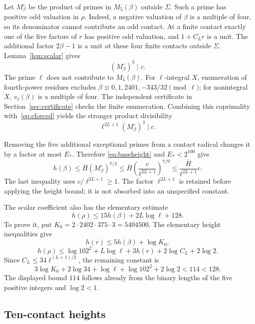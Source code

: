 \documentclass[11pt,a4paper]{article}
\begin{document}
Let $M_\beta^\circ$ be the product of primes in $M_5(\beta)$
outside $\Sigma$. Such a prime has positive odd valuation in $\rho$.
Indeed, a negative valuation of $\beta$ is a multiple of four,
so its denominator cannot contribute an odd contact. At a finite
contact exactly one of the five factors of $r$ has positive odd
valuation, and $1+C_Lr$ is a unit. The additional factor $2\beta-1$
is a unit at these four finite contacts outside $\Sigma$.
Lemma~\ref{lem:scalar} gives
\[
                         (M_\beta^\circ)^3\mid c.
\]
The prime $\ell$ does not contribute to $M_5(\beta)$. For
$\ell$-integral $X$, enumeration of fourth-power residues excludes
$\beta\equiv0,1,2401,-343/32\pmod\ell$; for nonintegral $X$,
$v_\ell(\beta)$ is a multiple of four. The independent certificate
in Section~\ref{sec:certificate} checks the finite enumeration.
Combining this coprimality with~\eqref{eq:cforced} yields the stronger
product divisibility
\begin{equation}\label{eq:coprime}
               \ell^{2L+1}(M_\beta^\circ)^3\mid c.
\end{equation}

Removing the five additional exceptional primes from a contact
radical changes it by a factor at most $E_*$. Therefore
\eqref{eq:baseheight} and $E_*<2^{100}$ give
\begin{equation}\label{eq:scalarheight}
 h(\beta)\le\overline H(M_\beta^\circ)^{7/3}
       \le\overline H\left(\frac{c}{\ell^{2L+1}}\right)^{7/9}
       \le\frac{\overline H}{\ell^{2L+1}}c.
\end{equation}
The last inequality uses $c/\ell^{2L+1}\ge1$. The factor
$\ell^{2L+1}$ is retained before applying the height bound; it is
not absorbed into an unspecified constant.

The scalar coefficient also has the elementary estimate
\begin{equation}\label{eq:rhoheight}
                    h(\rho)\le15h(\beta)+2L\log\ell+128.
\end{equation}
To prove it, put $K_0=2\cdot2402\cdot375\cdot3=5404500$.
The elementary height inequalities give
\[
 h(r)\le5h(\beta)+\log K_0,
\]
\[
 h(\rho)\le\log102^2+L\log\ell+3h(r)+2\log C_L+2\log2.
\]
Since $C_L\le34\ell^{(L+1)/2}$, the remaining constant is
\[
 3\log K_0+2\log34+\log\ell+\log102^2+2\log2<114<128.
\]
The displayed bound $114$ follows already from the binary lengths
of the five positive integers and $\log2<1$.

\subsection{Ten-contact heights}
\end{document}
